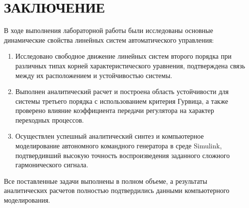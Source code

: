\documentclass[14pt,a4paper]{extarticle}
\begin{document}
\newpage
\section*{ЗАКЛЮЧЕНИЕ}

В ходе выполнения лабораторной работы были исследованы основные динамические свойства линейных систем автоматического управления:
\begin{enumerate}
    \item Исследовано свободное движение линейных систем второго порядка при различных типах корней характеристического уравнения, подтверждена связь между их расположением и устойчивостью системы.
    \item Выполнен аналитический расчет и построена область устойчивости для системы третьего порядка с использованием критерия Гурвица, а также проверено влияние коэффициента передачи регулятора на характер переходных процессов.
    \item Осуществлен успешный аналитический синтез и компьютерное моделирование автономного командного генератора в среде Simulink, подтвердивший высокую точность воспроизведения заданного сложного гармонического сигнала.
\end{enumerate}
Все поставленные задачи выполнены в полном объеме, а результаты аналитических расчетов полностью подтвердились данными компьютерного моделирования.
\end{document}
